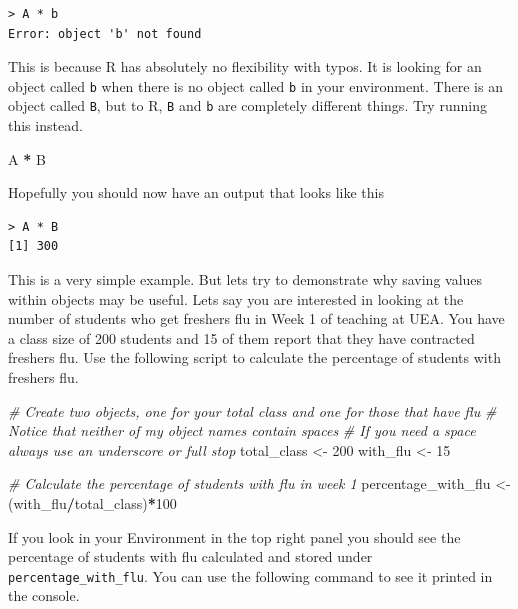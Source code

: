 \documentclass[
]{book}
\newenvironment{Shaded}{\begin{snugshade}}{\end{snugshade}}
\newcommand{\CommentTok}[1]{\textcolor[rgb]{0.56,0.35,0.01}{\textit{#1}}}
\newcommand{\DecValTok}[1]{\textcolor[rgb]{0.00,0.00,0.81}{#1}}
\newcommand{\NormalTok}[1]{#1}
\newcommand{\OtherTok}[1]{\textcolor[rgb]{0.56,0.35,0.01}{#1}}
\newcommand{\SpecialCharTok}[1]{\textcolor[rgb]{0.81,0.36,0.00}{\textbf{#1}}}
\begin{document}
\begin{verbatim}
> A * b
Error: object 'b' not found
\end{verbatim}

This is because R has absolutely no flexibility with typos. It is looking for an object called \texttt{b} when there is no object called \texttt{b} in your environment. There is an object called \texttt{B}, but to R, \texttt{B} and \texttt{b} are completely different things. Try running this instead.

\begin{Shaded}
\begin{Highlighting}[]
\NormalTok{A }\SpecialCharTok{*}\NormalTok{ B}
\end{Highlighting}
\end{Shaded}

Hopefully you should now have an output that looks like this

\begin{verbatim}
> A * B
[1] 300
\end{verbatim}

This is a very simple example. But lets try to demonstrate why saving values within objects may be useful. Lets say you are interested in looking at the number of students who get freshers flu in Week 1 of teaching at UEA. You have a class size of 200 students and 15 of them report that they have contracted freshers flu. Use the following script to calculate the percentage of students with freshers flu.

\begin{Shaded}
\begin{Highlighting}[]
\CommentTok{\# Create two objects, one for your total class and one for those that have flu}
\CommentTok{\# Notice that neither of my object names contain spaces}
\CommentTok{\# If you need a space always use an underscore or full stop}
\NormalTok{total\_class }\OtherTok{\textless{}{-}} \DecValTok{200}
\NormalTok{with\_flu }\OtherTok{\textless{}{-}} \DecValTok{15}

\CommentTok{\# Calculate the percentage of students with flu in week 1}
\NormalTok{percentage\_with\_flu }\OtherTok{\textless{}{-}}\NormalTok{ (with\_flu}\SpecialCharTok{/}\NormalTok{total\_class)}\SpecialCharTok{*}\DecValTok{100}
\end{Highlighting}
\end{Shaded}

If you look in your Environment in the top right panel you should see the percentage of students with flu calculated and stored under \texttt{percentage\_with\_flu}. You can use the following command to see it printed in the console.
\end{document}
